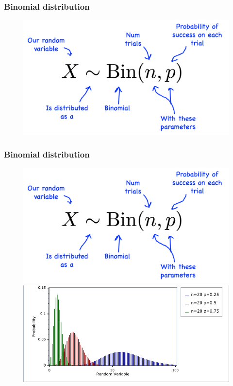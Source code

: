 \begin{frame}
    \frametitle{Binomial distribution}

    \begin{figure}
        \centering
        \includegraphics[width = 0.5\linewidth]{extraFigs/binomial_eq.png}
    \end{figure}
\end{frame}
\begin{frame}
    \frametitle{Binomial distribution}

    \begin{figure}
        \centering
        \includegraphics[width = 0.30\linewidth]{extraFigs/binomial_eq.png}
        \includegraphics[width = \linewidth]{extraFigs/binomial_distrib.png}
    \end{figure}
\end{frame}

